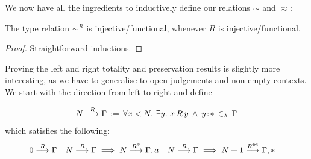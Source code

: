 \documentclass[a4paper,UKenglish]{lipics-v2016}
\newcommand{\ms}{\,}
\newcommand{\mrel}[1]{\mathrel{\ms #1 \ms}}
\newcommand{\mAnd}{\mrel{\wedge}}
\newcommand{\mAll}[1]{\ensuremath{\forall} #1.\ms\ms}
\newcommand{\mEx}[1]{\ensuremath{\exists} #1.\ms\ms}
\newcommand{\eqdef}{\mrel{:=}}
\newcommand{\ty}{\mathsf{ty}}
\newcommand{\tm}{\mathsf{tm}}
\newcommand{\of}{\ensuremath{\!:\!}}
\newcommand{\inL}{\mrel{\in_{\lambda}}}
\newcommand{\tyr}{\mathrel{\sim}}
\newcommand{\tmr}{\mathrel{\approx}}
\newcommand{\Rext}[1]{\ensuremath{#1^{\mathsf{ext}}}}
\newcommand{\Rshift}[1]{\ensuremath{#1^{\Uparrow}}}
\newcommand{\tyctxrelFL}[3]{\ensuremath{#1\mathrel{\mathop{\longrightarrow}^{#2}\limits}#3}}
\newcommand{\Prp}{\ensuremath{\textrm{\textasteriskcentered}}}
\newcommand{\All}{\ensuremath{\forall.\,}}
\newcommand{\Lam}[1]{\ensuremath{\lambda #1.\,}}
\newcommand{\TyLam}{\ensuremath{\Lambda.\,}}
\newcommand{\Prod}[1]{\ensuremath{\Pi #1.\,}}
\begin{document}
We now have all the ingredients to inductively define our relations $\tyr$ and $\tmr$:

\begin{lemma}
  The type relation $\tyr^R$ is injective/functional, whenever $R$ is injective/functional.
\end{lemma}
\begin{proof}
  Straightforward inductions.
\end{proof}
Proving the left and right totality and preservation results is slightly more interesting, as we have to generalise to open judgements and non-empty contexts.
We start with the direction from left to right and define

\begin{align*}
  \tyctxrelFL{N}{R}{\Gamma} \eqdef \mAll {x < N} \mEx y x\,R\,y \mAnd y \of \Prp \inL \Gamma
\end{align*}
which satisfies the following:
\begin{align*}
  &\tyctxrelFL{0}{R}{\Gamma} & &\tyctxrelFL{N}{R}{\Gamma} \implies \tyctxrelFL{N}{\Rshift{R}}{\Gamma,a} & &\tyctxrelFL{N}{R}{\Gamma} \implies \tyctxrelFL{N+1}{\Rext{R}}{\Gamma,\Prp}
\end{align*}
\end{document}
